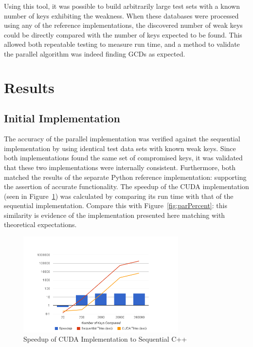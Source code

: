\documentclass[smallextended]{svjour3}       %
\begin{document}
Using this tool, it was possible to build arbitrarily large test sets with a 
known number of keys exhibiting the weakness. When these databases 
were processed using any of the reference implementations, the 
discovered number of weak keys could be directly compared with the 
number of keys expected to be found. This allowed both repeatable testing to 
measure run time, and a method to validate the parallel algorithm was indeed 
finding GCDs as expected. 


\section{Results}
\label{sec:results}

\subsection{Initial Implementation}
\label{subsec:initimpl}
The accuracy of the parallel implementation was verified against the 
sequential implementation by using identical test data sets with known 
weak keys. Since both implementations found the same set of compromised keys,
it was validated that these two implementations 
were internally consistent. Furthermore, both matched the results of the 
separate Python reference implementation: supporting the assertion of accurate 
functionality. The speedup of the CUDA implementation (seen in
Figure~\ref{fig:speedup}) was calculated by comparing its run time with that
of the sequential implementation. Compare this with Figure~\ref{fig:parPercent}:
this similarity is evidence of the implementation presented here matching
with theoretical expectations.

\begin{figure}
   \centering
   \includegraphics[width=0.75\textwidth]{chart_1}
   \caption{Speedup of CUDA Implementation to Sequential C++}
   \label{fig:speedup}
\end{figure}
\end{document}
